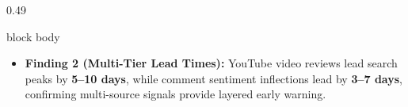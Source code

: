 \documentclass[aspectratio=169, 10pt]{beamer}
\newenvironment{card}[1][]{%
        \begin{beamercolorbox}[rounded=true,shadow=false,wd=\linewidth,sep=3.5pt,#1]{block body}%
        \fontsize{7.8pt}{9.8pt}\selectfont%
    }{%
        \end{beamercolorbox}%
    }
\begin{document}
\begin{frame}[t]
\begin{columns}[T]
\begin{column}{0.49\textwidth}
\begin{card}
\begin{itemize}
                        \item \textbf{Finding 2 (Multi-Tier Lead Times):} YouTube video reviews lead search peaks by \textbf{5--10 days}, while comment sentiment inflections lead by \textbf{3--7     
  days}, confirming multi-source signals provide layered early warning.                                                                                                                                
                    \end{itemize}                                                                                                                                                                      
                \end{card}                                                                                                                                                                             
            \end{column}                                                                                                                                                                               
                                                                                                                                                                                                       

\end{columns}
\end{frame}
\end{document}
